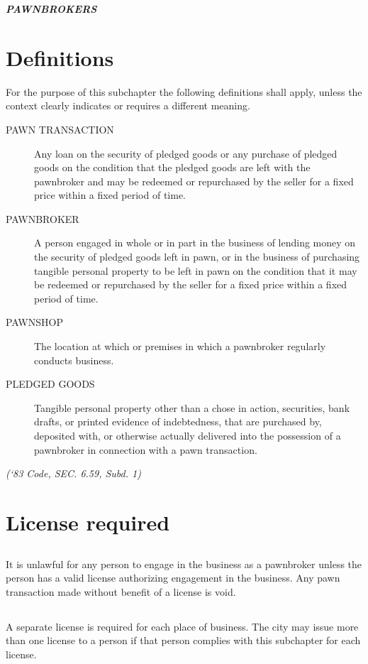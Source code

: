 \begin{center}
    \emph{\textbf{\LARGE{PAWNBROKERS}}}
\end{center}

\setcounter{section}{29}
\section{Definitions}
For the purpose of this subchapter the following definitions shall apply, unless the context clearly indicates or requires a different meaning.
\begin{description}
    \item[PAWN TRANSACTION] Any loan on the security of pledged goods or any purchase of pledged goods on the condition that the pledged goods are left with the pawnbroker and may be redeemed or repurchased by the seller for a fixed price within a fixed period of time.
    \item[PAWNBROKER] A person engaged in whole or in part in the business of lending money on the security of pledged goods left in pawn, or in the business of purchasing tangible personal property to be left in pawn on the condition that it may be redeemed or repurchased by the seller for a fixed price within a fixed period of time.
    \item[PAWNSHOP] The location at which or premises in which a pawnbroker regularly conducts business.
    \item[PLEDGED GOODS] Tangible personal property other than a chose in action, securities, bank drafts, or printed evidence of indebtedness, that are purchased by, deposited with, or otherwise actually delivered into the possession of a pawnbroker in connection with a pawn transaction.
\end{description}
\emph{(‘83 Code, SEC. 6.59, Subd. 1)}
\section{License required}
\subsection{}
It is unlawful for any person to engage in the business as a pawnbroker unless the person has a valid license authorizing engagement in the business. Any pawn transaction made without benefit of a license is void.
\subsection{}
A separate license is required for each place of business. The city may issue more than one license to a person if that person complies with this subchapter for each license.
